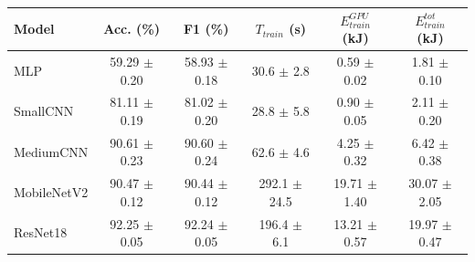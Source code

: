 \begin{tabular}{lccccc}
\toprule
Model & Acc. (\%) & F1 (\%) & $T_{train}$ (s) & $E^{GPU}_{train}$ (kJ) & $E^{tot}_{train}$ (kJ) \\
\midrule
MLP & 59.29 $\pm$ 0.20 & 58.93 $\pm$ 0.18 & 30.6 $\pm$ 2.8 & 0.59 $\pm$ 0.02 & 1.81 $\pm$ 0.10 \\
SmallCNN & 81.11 $\pm$ 0.19 & 81.02 $\pm$ 0.20 & 28.8 $\pm$ 5.8 & 0.90 $\pm$ 0.05 & 2.11 $\pm$ 0.20 \\
MediumCNN & 90.61 $\pm$ 0.23 & 90.60 $\pm$ 0.24 & 62.6 $\pm$ 4.6 & 4.25 $\pm$ 0.32 & 6.42 $\pm$ 0.38 \\
MobileNetV2 & 90.47 $\pm$ 0.12 & 90.44 $\pm$ 0.12 & 292.1 $\pm$ 24.5 & 19.71 $\pm$ 1.40 & 30.07 $\pm$ 2.05 \\
ResNet18 & 92.25 $\pm$ 0.05 & 92.24 $\pm$ 0.05 & 196.4 $\pm$ 6.1 & 13.21 $\pm$ 0.57 & 19.97 $\pm$ 0.47 \\
\bottomrule
\end{tabular}
